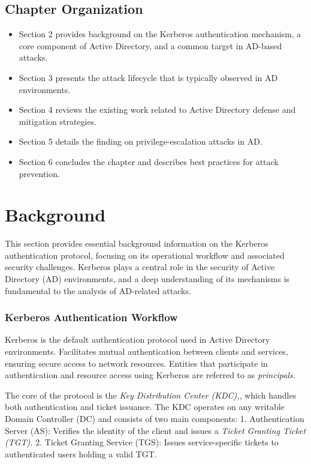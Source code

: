 {\subsection{Chapter Organization}
\begin{itemize}
    \item Section 2 provides background on the Kerberos authentication mechanism, a core component of Active Directory, and a common target in AD-based attacks.
    \item Section 3 presents the attack lifecycle that is typically observed in AD environments.
    \item Section 4 reviews the existing work related to Active Directory defense and mitigation strategies.
    \item Section 5 details the finding on privilege-escalation attacks in AD.
    \item Section 6 concludes the chapter and describes best practices for attack prevention.
\end{itemize}

\section{Background}
This section provides essential background information on the Kerberos authentication protocol, focusing on its operational workflow and associated security challenges. Kerberos plays a central role in the security of Active Directory (AD) environments, and a deep understanding of its mechanisms is fundamental to the analysis of AD-related attacks.

\subsubsection{Kerberos Authentication Workflow}
Kerberos is the default authentication protocol used in Active Directory environments. Facilitates mutual authentication between clients and services, ensuring secure access to network resources. Entities that participate in authentication and resource access using Kerberos are referred to as \textit{principals.}

The core of the protocol is the \textit{Key Distribution Center (KDC),}, which handles both authentication and ticket issuance. The KDC operates on any writable Domain Controller (DC) and consists of two main components:
1. Authentication Server (AS): Verifies the identity of the client and issues a \textit{Ticket Granting Ticket (TGT).}
2. Ticket Granting Service (TGS): Issues service-specific tickets to authenticated users holding a valid TGT.

}
